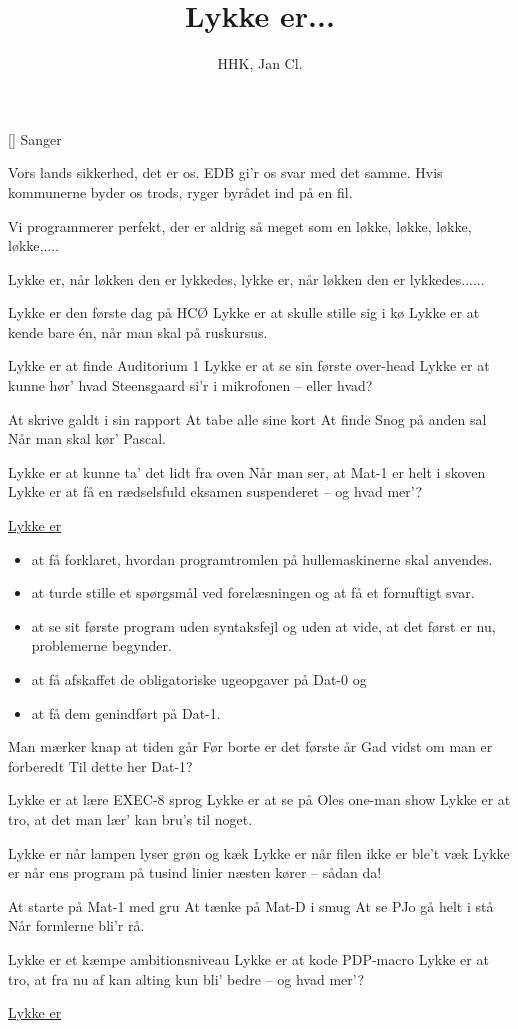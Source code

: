 \documentclass[a4paper,11pt]{article}
\title{Lykke er...}
\author{HHK, Jan Cl.}
\begin{document}
\maketitle

\begin{roles}
[] Sanger
\end{roles}


\begin{song}
%
Vors lands sikkerhed, det er os.
EDB gi'r os svar med det samme.
Hvis kommunerne byder os trods,
ryger byrådet ind på en fil.

Vi programmerer perfekt,
der er aldrig så meget som en løkke,
løkke, løkke, løkke,....

%
Lykke er, når løkken den er lykkedes,
lykke er, når løkken den er lykkedes......

Lykke er den første dag på HCØ
Lykke er at skulle stille sig i kø
Lykke er at kende bare én, når man skal på ruskursus.

Lykke er at finde Auditorium 1
Lykke er at se sin første over-head
Lykke er at kunne hør' hvad Steensgaard si'r i mikrofonen -- eller hvad?

At skrive galdt i sin rapport
At tabe alle sine kort
At finde Snog på anden sal
Når man skal kør' Pascal.

Lykke er at kunne ta' det lidt fra oven
Når man ser, at Mat-1 er helt i skoven
Lykke er at få en rædselsfuld eksamen suspenderet -- og hvad mer'?

\underline{Lykke er}
\end{song}
\begin{itemize}
\item at få forklaret, hvordan programtromlen på hullemaskinerne skal anvendes.
\item at turde stille et spørgsmål ved forelæsningen og at få et fornuftigt svar.
\item at se sit første program uden syntaksfejl og uden at vide, at det først er
  nu, problemerne begynder.
\item at få afskaffet de obligatoriske ugeopgaver på Dat-0 og
\item at få dem genindført på Dat-1.
\end{itemize}
\begin{song}
Man mærker knap at tiden går
Før borte er det første år
Gad vidst om man er forberedt
Til dette her Dat-1?

Lykke er at lære EXEC-8 sprog
Lykke er at se på Oles one-man show
Lykke er at tro, at det man lær' kan bru's til noget.

Lykke er når lampen lyser grøn og kæk
Lykke er når filen ikke er ble't væk
Lykke er når ens program på tusind linier næsten kører -- sådan da!

At starte på Mat-1 med gru
At tænke på Mat-D i smug
At se PJo gå helt i stå
Når formlerne bli'r rå.

Lykke er et kæmpe ambitionsniveau
Lykke er at kode PDP-macro
Lykke er at tro, at fra nu af kan alting kun bli' bedre -- og hvad mer'?

\underline{Lykke er}
\end{song}
\end{document}
